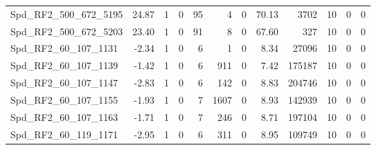 \begin{longtable}[c]{@{}lrrrrrrrrrrr@{}}
Spd\_RF2\_500\_672\_5195     & 24.87                  & 1                       & 0                       & 95                     & 4                       & 0                       & 70.13                   & 3702                     & 10                       & 0                        & 0                        \\
Spd\_RF2\_500\_672\_5203     & 23.40                  & 1                       & 0                       & 91                     & 8                       & 0                       & 67.60                   & 327                      & 10                       & 0                        & 0                        \\
Spd\_RF2\_60\_107\_1131      & -2.34                  & 1                       & 0                       & 6                      & 1                       & 0                       & 8.34                    & 27096                    & 10                       & 0                        & 0                        \\
Spd\_RF2\_60\_107\_1139      & -1.42                  & 1                       & 0                       & 6                      & 911                     & 0                       & 7.42                    & 175187                   & 10                       & 0                        & 0                        \\
Spd\_RF2\_60\_107\_1147      & -2.83                  & 1                       & 0                       & 6                      & 142                     & 0                       & 8.83                    & 204746                   & 10                       & 0                        & 0                        \\
Spd\_RF2\_60\_107\_1155      & -1.93                  & 1                       & 0                       & 7                      & 1607                    & 0                       & 8.93                    & 142939                   & 10                       & 0                        & 0                        \\
Spd\_RF2\_60\_107\_1163      & -1.71                  & 1                       & 0                       & 7                      & 246                     & 0                       & 8.71                    & 197104                   & 10                       & 0                        & 0                        \\
Spd\_RF2\_60\_119\_1171      & -2.95                  & 1                       & 0                       & 6                      & 311                     & 0                       & 8.95                    & 109749                   & 10                       & 0                        & 0                        \\

\end{longtable}
